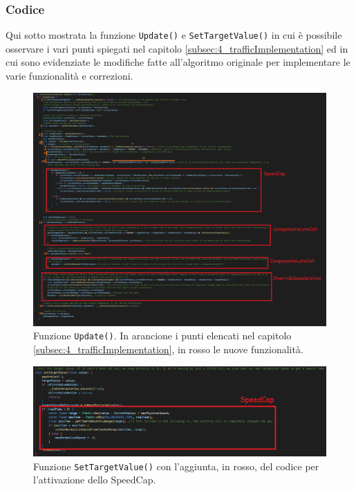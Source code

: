 \documentclass[main.tex]{subfiles}
\begin{document}
\subsubsection{Codice}\label{subsubsec:4_2_Code}
Qui sotto mostrata la funzione \lstinline{Update()} e \lstinline{SetTargetValue()} in cui è possibile osservare i vari punti spiegati nel capitolo \ref{subsec:4_trafficImplementation} ed in cui sono evidenziate le modifiche fatte all'algoritmo originale per implementare le varie funzionalità e correzioni.
\begin{figure}[H]
    \centering
    \includegraphics[width=1\linewidth]{img/interpolazione/Update.png}
    \caption{Funzione \lstinline{Update()}. In arancione i punti elencati nel capitolo \ref{subsec:4_trafficImplementation}, in rosso le nuove funzionalità.}
    \label{fig:4_Update}
\end{figure}
\begin{figure}[H]
    \centering
    \includegraphics[width=1\linewidth]{img/interpolazione/SetTargetValue.png}
    \caption{Funzione \lstinline{SetTargetValue()} con l'aggiunta, in rosso, del codice per l'attivazione dello SpeedCap.}
    \label{fig:4_SetTargetValue}
\end{figure}
\end{document}
